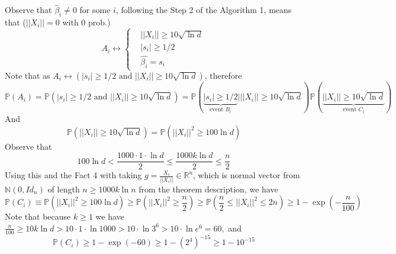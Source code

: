 \documentclass[]{article}
\begin{document}
Observe that $\hat{\beta}_i \ne 0$ for some $i$, following the Step 2 of the Algorithm 1, means that ($||X_i||=0$ with 0 prob.)
$$A_i \leftrightarrow \begin{cases}
&||X_i|| \ge 10\sqrt{\ln d}\\
&|s_i| \ge 1/2\\
& \hat{\beta_i} = s_i
\end{cases}
$$
Note that as $A_i \leftrightarrow (|s_i| \ge 1/2 \text{ and }||X_i|| \ge 10\sqrt{\ln d})$, therefore 
\begin{equation}
\mathbb{P}(A_i) 
=\mathbb{P}\left(|s_i| \ge 1/2
\text{ and } ||X_i|| \ge 10\sqrt{\ln d}\right)
=\mathbb{P}\left(\underbrace{|s_i| \ge 1/2}_{\text{event } B_i}
\bigg\vert||X_i|| \ge 10\sqrt{\ln d}\right)\mathbb{P}\left(\underbrace{||X_i|| \ge 10\sqrt{\ln d}}_{\text{event } C_i}\right)
\label{bc}
\end{equation} 
And 
\begin{equation}
\mathbb{P}\left(||X_i|| \ge 10\sqrt{\ln d}\right)
=\mathbb{P}\left(||X_i||^2 \ge 100\ln d\right)
\end{equation}
Observe that
\begin{equation}
100\ln{d} 
< \frac{1000\cdot 1 \cdot\ln{d}}{2}
\le \frac{1000k\ln{d}}{2}
\le \frac{n}{2}
\end{equation}
Using this and the Fact 4 with taking $g=\frac{X_i}{||X_i||}\in\mathbb{R}^n$, which is normal vector from $\mathbb{N}(0, Id_n)$ of length $n\ge1000 k \ln{n}$ from the theorem description, we have
\begin{equation}
\mathbb{P}\left(C_i\right)
\equiv \mathbb{P}\left(||X_i||^2 \ge 100\ln d\right)
\ge
\mathbb{P}\left(||X_i||^2\ge \frac{n}{2}\right)
\ge
\mathbb{P}\left(\frac{n}{2}\le ||X_i||^2\le 2n\right)\ge 1-\exp\left(-\frac{n}{100}\right)
\end{equation}
Note that because $k\ge 1$ we have $\frac{n}{100}\ge 10k\ln{d} >10\cdot 1 \cdot \ln{1000}> 10\cdot \ln{3^6}>10\cdot \ln{e^6}=60,$ 
and
\begin{equation}
\mathbb{P}\left(C_i\right)
\ge 1-\exp\left(-60\right)
\ge 1-({2^{4}})^{-15}
\ge 1 - 10^{-15}
\end{equation}
\end{document}
